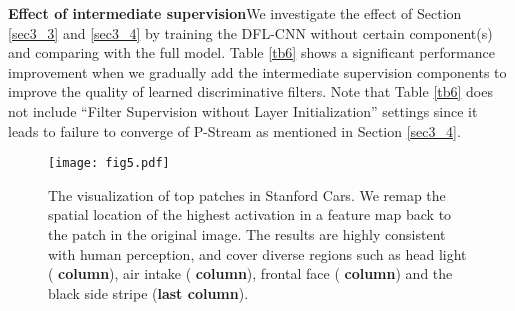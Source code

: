 \documentclass[10pt,twocolumn,letterpaper]{article}
\begin{document}
\begin{table}
\centering
{}
\vspace{1pt}
\caption{\label{tb8}Effect of BBox evaluated on CUB-200-2011.}
\vspace{-10pt}
\end{table}

\noindent\textbf{Effect of intermediate supervision}\quad We investigate the effect of Section
\ref{sec3_3} and \ref{sec3_4} by training the DFL-CNN without certain component(s) and comparing with the full model.
Table \ref{tb6} shows a significant performance improvement when we gradually add the intermediate supervision
components to improve the quality of learned discriminative filters. Note that Table \ref{tb6} does not include ``Filter
Supervision without Layer Initialization'' settings since it leads to failure to converge of P-Stream as mentioned in Section
\ref{sec3_4}.

\begin{figure*}
\begin{center}
\texttt{[image: fig5.pdf]}
\end{center}
   \vspace{-10pt}
\caption{\label{fig5} The visualization of top patches in Stanford Cars. We remap the spatial location of the highest
activation in a feature map back to the patch in the original image. The results are highly consistent
with human perception, and cover diverse regions such as head light
(\textbf{ column}), air intake (\textbf{ column}), frontal face (\textbf{ column})
and the black side stripe (\textbf{last column}).}
   \vspace{-10pt}
\end{figure*}
\end{document}
